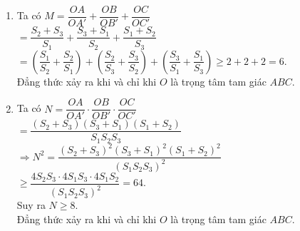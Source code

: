 \begin{bt}
{\begin{enumerate}
			\item Ta có $M = \dfrac{OA}{OA'} + \dfrac{OB}{OB'} + \dfrac{OC}{OC'}$\\
					\phantom{Ta có $M$} $= \dfrac{S_2 + S_3}{S_1} + \dfrac{S_3 + S_1}{S_2} + \dfrac{S_1 + S_2}{S_3}$\\
					\phantom{Ta có $M$} $= \left(\dfrac{S_1}{S_2} + \dfrac{S_2}{S_1}\right) + \left(\dfrac{S_2}{S_3} + \dfrac{S_3}{S_2}\right) + \left(\dfrac{S_3}{S_1} + \dfrac{S_1}{S_3}\right) \geq 2 + 2 + 2 = 6$.\\
					Đẳng thức xảy ra khi và chỉ khi $O$ là trọng tâm tam giác $ABC$.
			\item Ta có $N = \dfrac{OA}{OA'} \cdot \dfrac{OB}{OB'} \cdot \dfrac{OC}{OC'}$\\
					\phantom{Ta có $N$} $= \dfrac{(S_2 + S_3)(S_3 + S_1)(S_1 + S_2)}{S_1S_2S_3}$\\
					$\Rightarrow N^2 = \dfrac{(S_2 + S_3)^2(S_3 + S_1)^2(S_1 + S_2)^2}{(S_1S_2S_3)^2}$\\
					\phantom{$\Rightarrow$} $\geq \dfrac{4S_2S_3 \cdot 4S_1S_3 \cdot 4S_1S_2}{(S_1S_2S_3)^2} = 64$.\\
					Suy ra $N \geq 8$.\\
					Đẳng thức xảy ra khi và chỉ khi $O$ là trọng tâm tam giác $ABC$.
		\end{enumerate}
	}
\end{bt}

